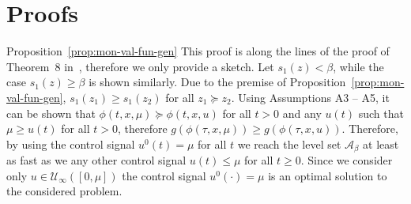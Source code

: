 \documentclass[letterpaper, 10pt, journal]{IEEEtran}  %
\newcommand{\cA}{{\mathcal A}}
\newcommand{\cU}{{\mathcal U}}
\def\QED{\mbox{\rule[0pt]{1.3ex}{1.3ex}}} %
\newenvironment{proof-of}[1]{{\it Proof of #1:\,}}{\hfill\QED\par}
\begin{document}

\appendices
\section{Proofs}
\label{app:proofs}
	\begin{proof-of}{Proposition~\ref{prop:mon-val-fun-gen}} 
This proof is along the lines of the proof of Theorem~8 in~\cite{sootla2016optimalswitching}, therefore we only provide a sketch. Let $s_1(z) <\beta$, while the case $s_1(z) \ge \beta$ is shown similarly. Due to the premise of Proposition~\ref{prop:mon-val-fun-gen}, $s_1(z_1) \ge s_1(z_2)$ for all $z_1 \succeq z_2$. Using Assumptions A3 -- A5, it can be shown that $\phi(t, x, \mu) \succeq \phi(t, x, u)$ for all $t>0$ and any $u(t)$ such that  $\mu \ge u(t)$ for all $t>0$, therefore $g(\phi(\tau, x, \mu)) \ge g(\phi(\tau, x, u))$. Therefore, by using the control signal $u^0(t) = \mu$ for all $t$ we reach the level set $\cA_\beta$ at least as fast as we any other control signal $u(t) \le \mu$ for all $t\ge 0$. Since we consider only $u\in \cU_{\infty}([0,\mu])$ the control signal $u^0(\cdot) = \mu$ is an optimal solution to the considered problem.	
\end{proof-of}
\end{document}
